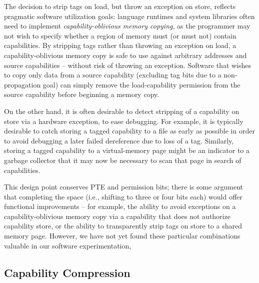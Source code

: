 The decision to strip tags on load, but throw an exception on
store, reflects
pragmatic software utilization goals: language runtimes and system libraries
often need to implement \textit{capability-oblivious memory copying}, as the
programmer may not wish to specify whether a region of memory must (or must
not) contain capabilities.
By stripping tags rather than throwing an exception on load, a
capability-oblivious memory copy is safe to use against arbitrary
addresses and source capabilities -- without risk of throwing an exception.
Software that wishes to copy only data from a source capability (excluding tag
bits due to a non-propagation goal) can simply remove the load-capability
permission from the source capability before beginning a memory copy.

On the other hand, it is often desirable to detect stripping of a capability on
store via a hardware exception, to ease debugging.
For example, it is typically desirable to catch storing a tagged capability to
a file as early as possible in order to avoid debugging a later failed
dereference due to loss of a tag.
Similarly, storing a tagged capability to a virtual-memory page might be an
indicator to a garbage collector that it may now be necessary to scan that
page in search of capabilities.

This design point conserves PTE and permission bits; there is some argument
that completing the space (i.e., shifting to three or four bits
each) would
offer functional improvements -- for example, the ability to avoid exceptions on
a capability-oblivious memory copy via a capability that does not authorize
capability store, or the ability to transparently strip tags on store to a
shared memory page.
However, we have not yet found these particular combinations valuable in our software experimentation,

\subsection{Capability Compression}
\label{sec:model-compression}


